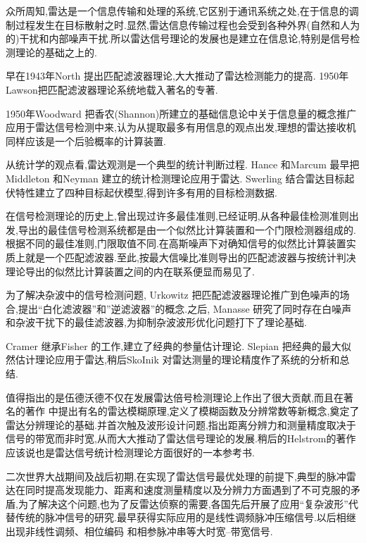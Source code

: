 众所周知,雷达是一个信息传输和处理的系统,它区别于通讯系统之处,在于信息的调制过程发生在目标散射之时.显然,雷达信息传输过程也会受到各种外界(自然和人为的)干扰和内部噪声干扰.所以雷达信号理论的发展也是建立在信息论,特别是信号检测理论的基础之上的.

早在1943年North 提出匹配滤波器理论,大大推动了雷达检测能力的提高. 1950年Lawson把匹配滤波器理论系统地载入著名的专著.

1950年Woodward 把香农(Shannon)所建立的基础信息论中关于信息量的概念推广应用于雷达信号检测中来,认为从提取最多有用信息的观点出发,理想的雷达接收机同样应该是一个后验概率的计算装置.

从统计学的观点看,雷达观测是一个典型的统计判断过程. Hance 和Marcum 最早把Middleton  和Neyman 建立的统计检测理论应用于雷达. Swerling 结合雷达目标起伏特性建立了四种目标起伏模型,得到许多有用的目标检测数据.

在信号检测理论的历史上,曾出现过许多最佳准则,已经证明,从各种最佳检测准则出发,导出的最佳信号检测系统都是由一个似然比计算装置和一个门限检测器组成的.根据不同的最佳准则,门限取值不同.在高斯噪声下对确知信号的似然比计算装置实质上就是一个匹配滤波器.至此,按最大信噪比准则导出的匹配滤波器与按统计判决理论导出的似然比计算装置之间的内在联系便显而易见了.

为了解决杂波中的信号检测问题, Urkowitz 把匹配滤波器理论推广到色噪声的场合,提出``白化滤波器''和''逆滤波器''的概念.之后, Manasse 研究了同时存在白噪声和杂波干扰下的最佳滤波器,为抑制杂波波形优化问题打下了理论基础.

Cramer 继承Fisher 的工作,建立了经典的参量估计理论. Slepian 把经典的最大似然估计理论应用于雷达,稍后SkoInik 对雷达测量的理论精度作了系统的分析和总结.

值得指出的是伍德沃德不仅在发展雷达倍号检测理论上作出了很大贡献,而且在著名的著作 中提出有名的雷达模糊原理,定义了模糊函数及分辨常数等新概念,奠定了雷达分辨理论的基础.并首次触及波形设计问题,指出距离分辨力和测量精度取决于信号的带宽而非时宽,从而大大推动了雷达信号理论的发展.稍后的Helstrom的著作 应该说也是雷达信号统计检测理论方面很好的一本参考书.

二次世界大战期间及战后初期,在实现了雷达信号最优处理的前提下,典型的脉冲雷达在同时提高发现能力、距离和速度测量精度以及分辨力方面遇到了不可克服的矛盾,为了解决这个问题,也为了反雷达侦察的需要,各国先后开展了应用``复杂波形''代替传统的脉冲信号的研究.最早获得实际应用的是线性调频脉冲压缩信号.以后相继出现非线性调频、相位编码 和相参脉冲串等大时宽--带宽信号.

